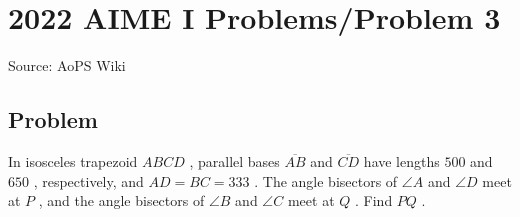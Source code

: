 \documentclass[12pt]{article}
\begin{document}
\section*{{2022 AIME I Problems/Problem 3}}
Source: AoPS Wiki

\subsection*{Problem}
In isosceles trapezoid $ABCD$ , parallel bases $\overline{AB}$ and $\overline{CD}$ have lengths $500$ and $650$ , respectively, and $AD=BC=333$ . The angle bisectors of $\angle{A}$ and $\angle{D}$ meet at $P$ , and the angle bisectors of $\angle{B}$ and $\angle{C}$ meet at $Q$ . Find $PQ$ .
\end{document}
